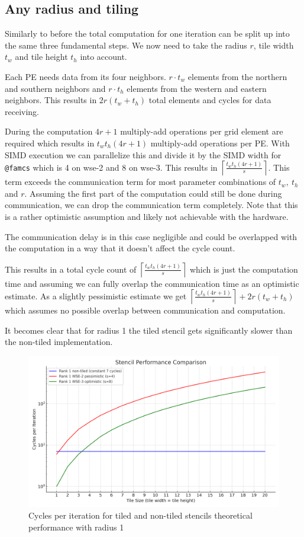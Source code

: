 \documentclass{article}
\begin{document}
\subsection{Any radius and tiling}
Similarly to before the total computation for one iteration can be split up into the same three fundamental steps. We now need to take the radius $r$, tile width $t_w$ and tile height $t_h$ into account.

Each PE needs data from its four neighbors. $r\cdot t_w$ elements from the northern and southern neighbors and $r\cdot t_h$ elements from the western and eastern neighbors. This results in $2r(t_w+t_h)$ total elements and cycles for data receiving.

During the computation $4r+1$ multiply-add operations per grid element are required which results in $t_wt_h(4r+1)$ multiply-add operations per PE. With SIMD execution we can parallelize this and divide it by the SIMD width for \texttt{@famcs} which is 4 on wse-2 and 8 on wse-3. This results in $\left\lceil\frac{t_wt_h(4r+1)}{s}\right\rceil$. This term exceeds the communication term for most parameter combinations of $t_w,\ t_h$ and $r$. Assuming the first part of the computation could still be done during communication, we can drop the communication term completely. Note that this is a rather optimistic assumption and likely not achievable with the hardware.

The communication delay is in this case negligible and could be overlapped with the computation in a way that it doesn't affect the cycle count. 

This results in a total cycle count of $\left\lceil\frac{t_wt_h(4r+1)}{s}\right\rceil$ which is just the computation time and assuming we can fully overlap the communication time as an optimistic estimate. As a slightly pessimistic estimate we get $\left\lceil\frac{t_wt_h(4r+1)}{s}\right\rceil+2r(t_w+t_h)$ which assumes no possible overlap between communication and computation. 

It becomes clear that for radius 1 the tiled stencil gets significantly slower than the non-tiled implementation. 
\begin{figure}
    \centering
    \includegraphics[width=0.5\linewidth]{stencil_performance_comparison.png}
    \caption{Cycles per iteration for tiled and non-tiled stencils theoretical performance with radius 1 }
    \label{fig:enter-label}
\end{figure}
\end{document}

